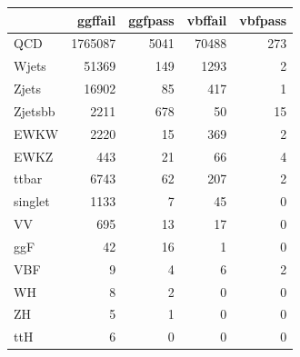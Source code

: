 \begin{tabular}{lrrrr}
\toprule
 & ggffail & ggfpass & vbffail & vbfpass \\
\midrule
QCD & 1765087 & 5041 & 70488 & 273 \\
Wjets & 51369 & 149 & 1293 & 2 \\
Zjets & 16902 & 85 & 417 & 1 \\
Zjetsbb & 2211 & 678 & 50 & 15 \\
EWKW & 2220 & 15 & 369 & 2 \\
EWKZ & 443 & 21 & 66 & 4 \\
ttbar & 6743 & 62 & 207 & 2 \\
singlet & 1133 & 7 & 45 & 0 \\
VV & 695 & 13 & 17 & 0 \\
ggF & 42 & 16 & 1 & 0 \\
VBF & 9 & 4 & 6 & 2 \\
WH & 8 & 2 & 0 & 0 \\
ZH & 5 & 1 & 0 & 0 \\
ttH & 6 & 0 & 0 & 0 \\
\bottomrule
\end{tabular}
